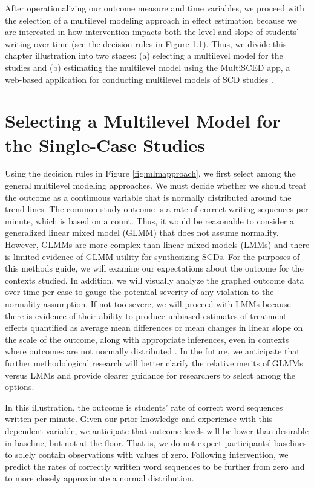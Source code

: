 \documentclass[
]{book}
\begin{document}
After operationalizing our outcome measure and time variables, we proceed with the selection of a multilevel modeling approach in effect estimation because we are interested in how intervention impacts both the level and slope of students' writing over time (see the decision rules in Figure 1.1). Thus, we divide this chapter illustration into two stages: (a) selecting a multilevel model for the studies and (b) estimating the multilevel model using the MultiSCED app, a web-based application for conducting multilevel models of SCD studies \citep{Declercq2020}.

\hypertarget{selecting-a-multilevel-model-for-the-single-case-studies-1}{%
\section{Selecting a Multilevel Model for the Single-Case Studies}\label{selecting-a-multilevel-model-for-the-single-case-studies-1}}

Using the decision rules in Figure \ref{fig:mlmapproach}, we first select among the general multilevel modeling approaches. We must decide whether we should treat the outcome as a continuous variable that is normally distributed around the trend lines. The common study outcome is a rate of correct writing sequences per minute, which is based on a count. Thus, it would be reasonable to consider a generalized linear mixed model (GLMM) that does not assume normality. However, GLMMs are more complex than linear mixed models (LMMs) and there is limited evidence of GLMM utility for synthesizing SCDs. For the purposes of this methods guide, we will examine our expectations about the outcome for the contexts studied. In addition, we will visually analyze the graphed outcome data over time per case to gauge the potential severity of any violation to the normality assumption. If not too severe, we will proceed with LMMs because there is evidence of their ability to produce unbiased estimates of treatment effects quantified as average mean differences or mean changes in linear slope on the scale of the outcome, along with appropriate inferences, even in contexts where outcomes are not normally distributed \citep{Declercq2019, Joo_Ferron_2019}. In the future, we anticipate that further methodological research will better clarify the relative merits of GLMMs versus LMMs and provide clearer guidance for researchers to select among the options.

In this illustration, the outcome is students' rate of correct word sequences written per minute. Given our prior knowledge and experience with this dependent variable, we anticipate that outcome levels will be lower than desirable in baseline, but not at the floor. That is, we do not expect participants' baselines to solely contain observations with values of zero. Following intervention, we predict the rates of correctly written word sequences to be further from zero and to more closely approximate a normal distribution.
\end{document}
